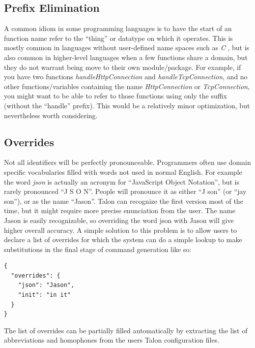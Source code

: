 \documentclass[../thesis.tex]{subfiles}
\begin{document}
\subsection{Prefix Elimination}\label{prefix_elimination}
A common idiom in some programming languages is to have the start of an function name refer to the ``thing''
or datatype on which it operates. This is mostly common in languages without user-defined name spaces such as \textit{C}
, but is also common in higher-level languages when a few functions share a domain, but they do not warrant
being move to their own module/package.
For example, if you have two functions \textit{handleHttpConnection} and \textit{handleTcpConnection}, and no other
functions/variables containing the name \textit{HttpConnection} or \textit{TcpConnection}, you might want to
be able to refer to those functions using only the suffix (without the ``handle'' prefix).
This would be a relatively minor optimization, but nevertheless worth considering.

\subsection{Overrides}\label{overrides}
Not all identifiers will be perfectly pronounceable.
Programmers often use domain specific vocabularies filled with words not used in normal English.
For example the word \textit{json} is actually an acronym for ``JavaScript Object Notation'', but is rarely
pronounced ``J S O N''.
People will pronounce it as either ``J son'' (or ``jay son''), or as the name ``Jason''.
Talon can recognize the first version most of the time, but it might require more precise enunciation from the user.
The name Jason is easily recognizable, so overriding the word json with Jason will give higher overall accuracy.
A simple solution to this problem is to allow users to declare a list of overrides for which the system
can do a simple lookup to make substitutions in the final stage of command generation like so:
\begin{verbatim}
{
  "overrides": {
    "json": "Jason",
    "init": "in it"
  }
}
\end{verbatim}
The list of overrides can be partially filled automatically by extracting the list of abbreviations and homophones
from the users Talon configuration files.



\end{document}

